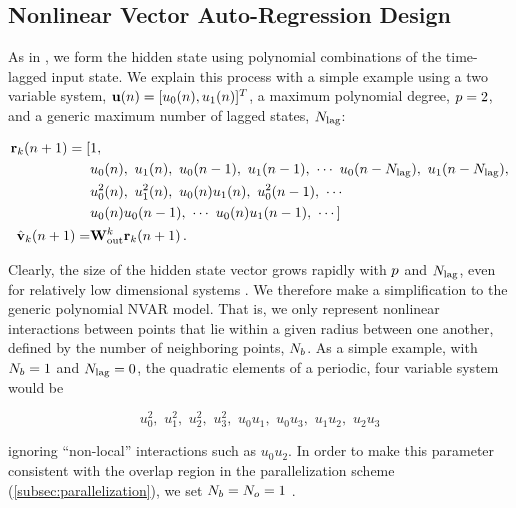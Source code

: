 \subsection{Nonlinear Vector Auto-Regression Design}
\label{subsec:nvar}

As in \citet{gauthier_next_2021,chen_next_2022}, we form the hidden state using
polynomial combinations of the time-lagged input state.
We explain this process with a simple example using a two variable system,
$\mathbf{u}(n) = [u_0(n), u_1(n)]^T$,
a maximum polynomial degree,
$p=2$, and a generic maximum number of lagged states, $N_\text{lag}$:
\begin{linenomath*}\begin{equation}
    \begin{aligned}
        \mathbf{r}_{k}(n+1)
        =
        [&1, \\
         &u_0(n), \,\, u_1(n), \,\,
        u_0(n-1),\,\, u_1(n-1), \,\,
        \cdots \,\,
        u_0(n-N_\text{lag}), \,\, u_1(n-N_\text{lag}), \\
         &u_0^2(n), \,\, u_1^2(n), \,\, u_0(n)u_1(n), \,\,
        u_0^2(n-1), \,\, \cdots \\
         &u_0(n)u_0(n-1), \,\, \cdots \,\,
        u_0(n)u_1(n-1), \,\, \cdots
        ] \\
        \hat{\mathbf{v}}_{k}(n+1) = &\mathbf{W}_\text{out}^{k} \mathbf{r}_{k}(n+1) \, .
    \end{aligned}
\end{equation}\end{linenomath*}
Clearly, the size of the hidden state vector grows rapidly with
$p$ and $N_\text{lag}$,
even for relatively low dimensional systems
\citep<see supplemental material of>[for explicit calculations]{chen_next_2022}.
We therefore make a simplification to the generic polynomial NVAR model.
That is, we only represent nonlinear interactions between points that lie
within a given radius between one another, defined by the number of neighboring
points, $N_{b}$.
As a simple example, with $N_{b}=1$ and $N_\text{lag}=0$, the quadratic elements of a periodic, four variable
system would be
\begin{linenomath*}\begin{equation*}
    u_0^2, \,\, u_1^2, \,\, u_2^2, \,\, u_3^2, \,\,
    u_0u_1, \,\, u_0u_3, \,\, u_1u_2, \,\, u_2u_3
\end{equation*}\end{linenomath*}
ignoring ``non-local'' interactions such as $u_0u_2$.
In order to make this parameter consistent with the overlap region in the
parallelization scheme (\cref{subsec:parallelization}),
we set $N_{b} = N_{o} = 1$ .

